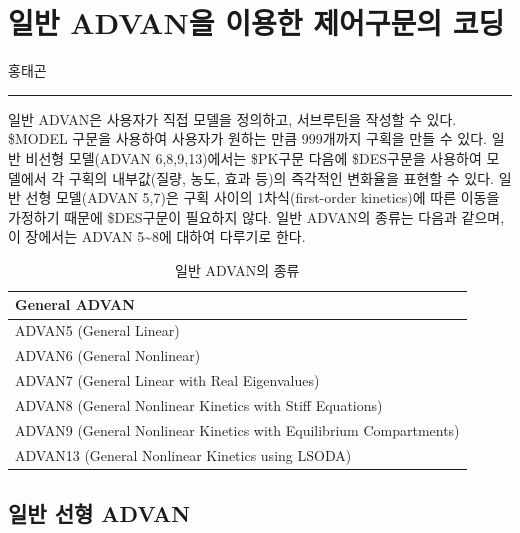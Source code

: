 \documentclass[
  11pt,
  krantz2,
  a4paper]{krantz}
\theoremstyle{definition}
\theoremstyle{definition}
\theoremstyle{definition}
\theoremstyle{remark}
\begin{document}
\normalsize

\hypertarget{general-advan}{%
\chapter{일반 ADVAN을 이용한 제어구문의 코딩}\label{general-advan}}

\Large\hfill

홍태곤
\normalsize

\begin{center}\rule{0.5\linewidth}{0.5pt}\end{center}

일반 ADVAN은 사용자가 직접 모델을 정의하고, 서브루틴을 작성할 수 있다. \$MODEL 구문을 사용하여 사용자가 원하는 만큼 999개까지 구획을 만들 수 있다. 일반 비선형 모델(ADVAN 6,8,9,13)에서는 \$PK구문 다음에 \$DES구문을 사용하여 모델에서 각 구획의 내부값(질량, 농도, 효과 등)의 즉각적인 변화율을 표현할 수 있다. 일반 선형 모델(ADVAN 5,7)은 구획 사이의 1차식(first-order kinetics)에 따른 이동을 가정하기 때문에 \$DES구문이 필요하지 않다. 일반 ADVAN의 종류는 다음과 같으며, 이 장에서는 ADVAN 5\textasciitilde8에 대하여 다루기로 한다.

\begin{table}

\caption{\label{tab:gen-advan}일반 ADVAN의 종류}
\centering
\begin{tabular}[t]{l}
\toprule
General ADVAN\\
\midrule
ADVAN5 (General Linear)\\
ADVAN6 (General Nonlinear)\\
ADVAN7 (General Linear with Real Eigenvalues)\\
ADVAN8 (General Nonlinear Kinetics with Stiff Equations)\\
ADVAN9 (General Nonlinear Kinetics with Equilibrium Compartments)\\
\addlinespace
ADVAN13 (General Nonlinear Kinetics using LSODA)\\
\bottomrule
\end{tabular}
\end{table}

\hypertarget{uxc77cuxbc18-uxc120uxd615-advan}{%
\section{일반 선형 ADVAN}\label{uxc77cuxbc18-uxc120uxd615-advan}}
\end{document}
